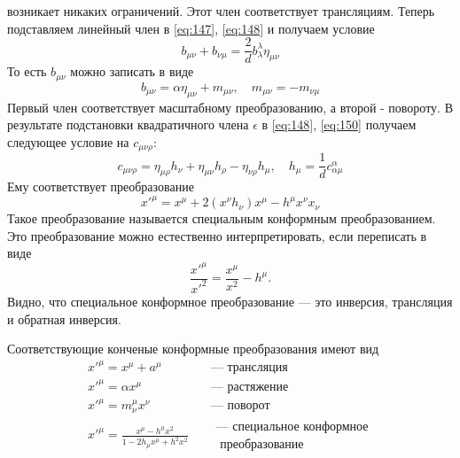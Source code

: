 \documentclass[a4paper,12pt]{article} \usepackage[utf8x]{inputenc} \usepackage[russian]{babel}
\theoremstyle{definition} \newtheorem{corollary}{Corollary}[theorem] \theoremstyle{definition}
\begin{document}
возникает никаких ограничений. Этот член соответствует трансляциям. Теперь подставляем линейный член
в \eqref{eq:147}, \eqref{eq:148} и получаем условие
\begin{equation}
  \label{eq:158} b_{\mu\nu}+b_{\nu\mu}=\frac{2}{d}b^{\lambda}_{\lambda}\eta_{\mu\nu}
\end{equation} То есть $b_{\mu\nu}$ можно записать в виде
\begin{equation}
  \label{eq:159} b_{\mu\nu}=\alpha \eta_{\mu\nu} +m_{\mu\nu},\quad m_{\mu\nu}=-m_{\nu\mu}
\end{equation} Первый член соответствует масштабному преобразованию, а второй - повороту. В
результате подстановки квадратичного члена $\epsilon$ в \eqref{eq:148}, \eqref{eq:150} получаем
следующее условие на $c_{\mu\nu\rho}$:
\begin{equation}
  \label{eq:160} c_{\mu\nu\rho}=\eta_{\mu\rho} h_{\nu} +\eta_{\mu\nu}h_{\rho}-\eta_{\nu\rho}h_{\mu},
\quad h_{\mu}=\frac{1}{d} c^{\alpha}_{\alpha\mu}
\end{equation} Ему соответствует преобразование
\begin{equation}
  \label{eq:161} x'^{\mu}=x^{\mu}+2 (x^{\nu}h_{\nu})x^{\mu} -h^{\mu} x^{\nu}x_{\nu}
\end{equation} Такое преобразование называется специальным конформным преобразованием. Это
преобразование можно естественно интерпретировать, если переписать в виде
\begin{equation}
  \label{eq:162} \frac{x'^{\mu}}{x'^2}=\frac{x^{\mu}}{x^2}-h^{\mu}.
\end{equation} Видно, что специальное конформное преобразование --- это инверсия, трансляция и
обратная инверсия.

Соответствующие конченые конформные преобразования имеют вид
\begin{eqnarray}
  \label{eq:163} x'^{\mu}=x^{\mu}+a^{\mu}&\quad \mbox{--- трансляция}\\ x'^{\mu}=\alpha x^{\mu}
&\quad \mbox{--- растяжение}\\ x'^{\mu}=m^{\mu}_{\nu} x^{\nu} &\quad \mbox{--- поворот}\\
x'^{\mu}=\frac{x^{\mu}-h^{\mu}x^2}{1-2h_{\mu}x^{\mu}+h^2 x^2} & \quad \begin{array}{c}\mbox{---
специальное конформное}\\ \mbox{ преобразование}\end{array}
\end{eqnarray}
\end{document}

